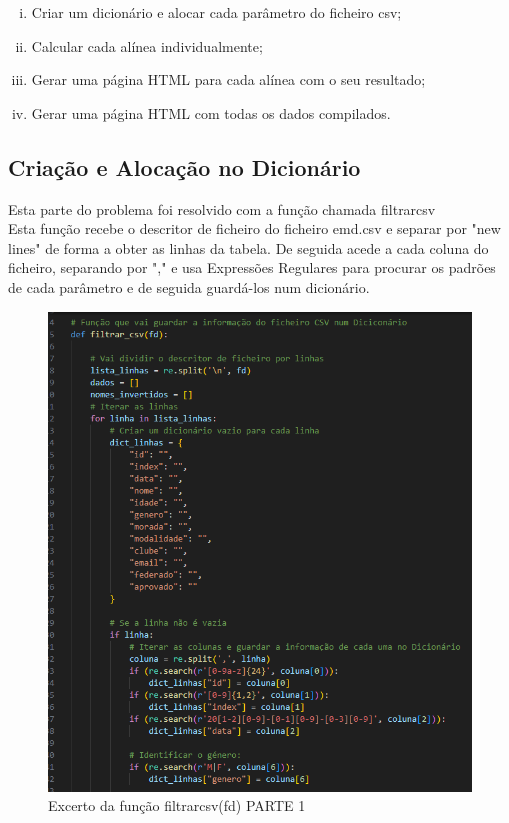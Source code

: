 \documentclass[11pt,a4paper]{report}%
\begin{document}
\begin{enumerate}[i)]
     \item Criar um dicionário e alocar cada parâmetro do ficheiro csv;
     \item Calcular cada alínea individualmente; 
     \item Gerar uma página HTML para cada alínea com o seu resultado;
	 \item Gerar uma página HTML com todas os dados compilados.
  \end{enumerate}
  
  
  
\subsection{Criação e Alocação no Dicionário} \label{subsec:parser2}
Esta parte do problema foi resolvido com a função chamada filtrar\textunderscore csv\\
Esta função recebe o descritor de ficheiro do ficheiro emd.csv e separar por "new lines" de forma a obter as linhas da tabela. De seguida acede a cada coluna do ficheiro, separando por "," e usa Expressões Regulares para procurar os padrões de cada parâmetro e de seguida guardá-los num dicionário.

\begin{figure}[htbp]
\centerline{\includegraphics{filtrar_csv1.png}}
\caption{Excerto da função filtrar\textunderscore csv(fd) PARTE 1}
\label{fig}
\end{figure}  
\end{document}
